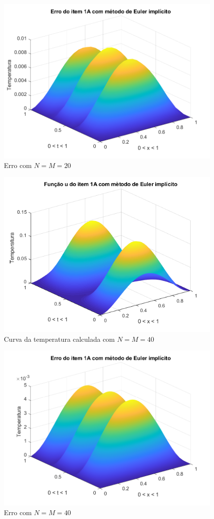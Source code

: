 \documentclass[12pt]{article}
\begin{document}
\begin{spacing}{1.5}
\begin{figure}
    \centering
    \includegraphics[width=0.8\linewidth]{Segunda_Tarefa/ItemB/nm20_erro_A.png}
    \caption{Erro com $N=M=20$}
    \label{fig:BA_nm20_erro}
\end{figure}

\begin{figure}
    \centering
    \includegraphics[width=0.8\linewidth]{Segunda_Tarefa/ItemB/nm40_calculada_A.png}
    \caption{Curva da temperatura calculada com $N=M=40$}
    \label{fig:BA_nm40_calculada}
\end{figure}

\begin{figure}
    \centering
    \includegraphics[width=0.8\linewidth]{Segunda_Tarefa/ItemB/nm40_erro_A.png}
    \caption{Erro com $N=M=40$}
    \label{fig:BA_nm40_erro}
\end{figure}


\end{spacing}
\end{document}
